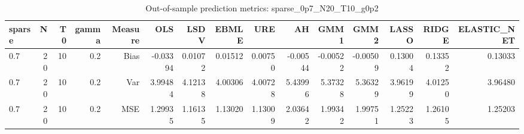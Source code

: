 \begin{table}[!htbp]\centering
\caption{Out-of-sample prediction metrics: sparse_0p7_N20_T10_g0p2}
\label{tab:table3_sparse_0p7_N20_T10_g0p2}
\begin{tabular}{lrrrrrrrrrrrrrr}
\hline
sparse & N & T0 & gamma & Measure & OLS & LSDV & EBMLE & URE & AH & GMM1 & GMM2 & LASSO & RIDGE & ELASTIC_NET \\
\hline
0.7 & 20 & 10 & 0.2 & Bias & -0.03394 & 0.01072 & 0.01512 & 0.00750 & -0.00544 & -0.00522 & -0.00509 & 0.13004 & 0.13352 & 0.13033 \\
0.7 & 20 & 10 & 0.2 & Var & 3.99484 & 4.12138 & 4.00306 & 4.00728 & 5.43996 & 5.37328 & 5.36329 & 3.96199 & 4.01250 & 3.96480 \\
0.7 & 20 & 10 & 0.2 & MSE & 1.29935 & 1.16135 & 1.13020 & 1.13009 & 2.03642 & 1.99342 & 1.99751 & 1.25223 & 1.26105 & 1.25203 \\
\hline
\end{tabular}
\end{table}

